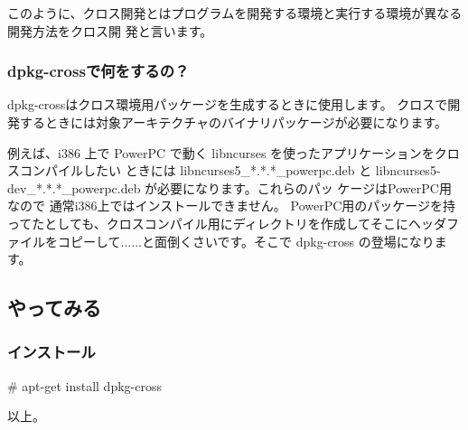\documentclass[mingoth]{jsarticle}
\begin{document}
このように、クロス開発とはプログラムを開発する環境と実行する環境が異なる開発方法をクロス開
発と言います。

\subsubsection{dpkg-crossで何をするの？}
dpkg-crossはクロス環境用パッケージを生成するときに使用します。
クロスで開発するときには対象アーキテクチャのバイナリパッケージが必要になります。

例えば、i386 上で PowerPC で動く libncurses を使ったアプリケーションをクロスコンパイルしたい
ときには libncurses5\_*.*.*\_powerpc.deb  と libncurses5-dev\_*.*.*\_powerpc.deb が必要になります。これらのパッ
ケージはPowerPC用なので 通常i386上ではインストールできません。 PowerPC用のパッケージを持ってたとしても、クロスコンパイル用にディレクトリを作成してそこにヘッダファイルをコピーして......と面倒くさいです。そこで dpkg-cross の登場になります。
\subsection{やってみる}
\subsubsection{インストール}
\# apt-get install dpkg-cross

以上。
\end{document}
